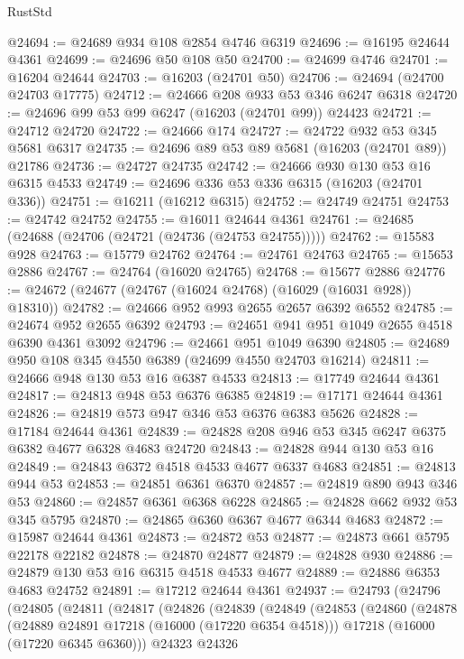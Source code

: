 \begin{lexlean}{RustStd}
\begin{coremodule}
@24694 := @24689 @934 @108 @2854 @4746 @6319
@24696 := @16195 @24644 @4361
@24699 := @24696 @50 @108 @50
@24700 := @24699 @4746
@24701 := @16204 @24644
@24703 := @16203 (@24701 @50)
@24706 := @24694 (@24700 @24703 @17775)
@24712 := @24666 @208 @933 @53 @346 @6247 @6318
@24720 := @24696 @99 @53 @99 @6247 (@16203 (@24701 @99)) @24423
@24721 := @24712 @24720
@24722 := @24666 @174
@24727 := @24722 @932 @53 @345 @5681 @6317
@24735 := @24696 @89 @53 @89 @5681 (@16203 (@24701 @89)) @21786
@24736 := @24727 @24735
@24742 := @24666 @930 @130 @53 @16 @6315 @4533
@24749 := @24696 @336 @53 @336 @6315 (@16203 (@24701 @336))
@24751 := @16211 (@16212 @6315)
@24752 := @24749 @24751
@24753 := @24742 @24752
@24755 := @16011 @24644 @4361
@24761 := @24685 (@24688 (@24706 (@24721 (@24736 (@24753 @24755)))))
@24762 := @15583 @928
@24763 := @15779 @24762
@24764 := @24761 @24763
@24765 := @15653 @2886
@24767 := @24764 (@16020 @24765)
@24768 := @15677 @2886
@24776 := @24672 (@24677 (@24767 (@16024 @24768) (@16029 (@16031 @928)) @18310))
@24782 := @24666 @952 @993 @2655 @2657 @6392 @6552
@24785 := @24674 @952 @2655 @6392
@24793 := @24651 @941 @951 @1049 @2655 @4518 @6390 @4361 @3092
@24796 := @24661 @951 @1049 @6390
@24805 := @24689 @950 @108 @345 @4550 @6389 (@24699 @4550 @24703 @16214)
@24811 := @24666 @948 @130 @53 @16 @6387 @4533
@24813 := @17749 @24644 @4361
@24817 := @24813 @948 @53 @6376 @6385
@24819 := @17171 @24644 @4361
@24826 := @24819 @573 @947 @346 @53 @6376 @6383 @5626
@24828 := @17184 @24644 @4361
@24839 := @24828 @208 @946 @53 @345 @6247 @6375 @6382 @4677 @6328 @4683 @24720
@24843 := @24828 @944 @130 @53 @16
@24849 := @24843 @6372 @4518 @4533 @4677 @6337 @4683
@24851 := @24813 @944 @53
@24853 := @24851 @6361 @6370
@24857 := @24819 @890 @943 @346 @53
@24860 := @24857 @6361 @6368 @6228
@24865 := @24828 @662 @932 @53 @345 @5795
@24870 := @24865 @6360 @6367 @4677 @6344 @4683
@24872 := @15987 @24644 @4361
@24873 := @24872 @53
@24877 := @24873 @661 @5795 @22178 @22182
@24878 := @24870 @24877
@24879 := @24828 @930
@24886 := @24879 @130 @53 @16 @6315 @4518 @4533 @4677
@24889 := @24886 @6353 @4683 @24752
@24891 := @17212 @24644 @4361
@24937 := @24793
    (@24796
      (@24805
        (@24811
          (@24817
            (@24826
              (@24839
                (@24849
                  (@24853
                    (@24860
                      (@24878
                        (@24889 @24891 @17218 (@16000 (@17220 @6354 @4518)))
                        @17218
                        (@16000 (@17220 @6345 @6360)))
                      @24323
                      @24326

\end{coremodule}
\end{lexlean}
